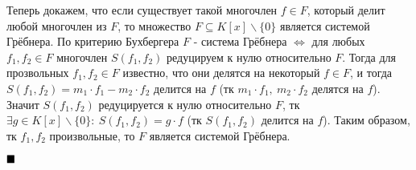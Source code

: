 \documentclass[a4paper, 16pt]{article}
\newenvironment{proof}[1][Доказательство]{%
	\begin{trivlist}
		\item[\hskip \labelsep {\bfseries #1:}]
		\item \hspace{14pt}
	}{
		$ \hfill\blacksquare $
	\end{trivlist}
	\hfill\break
}
\begin{document}
\begin{proof}
			Теперь докажем, что если существует такой многочлен $f \in F$, который делит любой многочлен из $F$, то множество $F \subseteq K[x] \backslash \{0\}$ является системой Грёбнера.
			По критерию Бухбергера $F$ - система Грёбнера $\Leftrightarrow$ для любых $f_1, f_2 \in F$ многочлен $S(f_1, f_2)$ редуцируем к нулю относительно $F$. Тогда для прозвольных $f_1, f_2 \in F$ известно, что они делятся на некоторый $f \in F$, и тогда $S(f_1, f_2) = m_1 \cdot f_1 - m_2 \cdot f_2$ делится на $f$ (тк $m_1 \cdot f_1, \ m_2 \cdot f_2$ делятся на $f$). Значит $S(f_1, f_2)$ редуцируется к нулю относительно $F$, тк $\exists g \in K[x] \backslash \{0\}: \ S(f_1, f_2) = g \cdot f$ (тк $S(f_1, f_2)$ делится на $f$). Таким образом, тк $f_1, f_2$ произвольные, то $F$ является системой Грёбнера.
		\end{proof}
	
	
\end{document}
